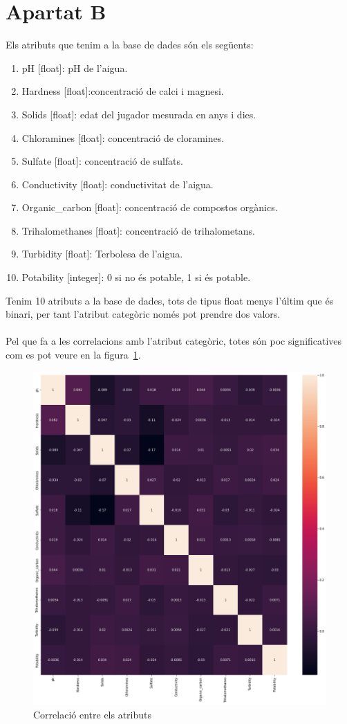 \documentclass{article}
\begin{document}
	\section*{Apartat B}
	Els atributs que tenim a la base de dades són els següents:
	\begin{enumerate}
		\addtocounter{enumi}{-1}
		\item pH [float]: pH de l'aigua.
		\item Hardness [float]:concentració de calci i magnesi.
		\item Solids [float]: edat del jugador mesurada en anys i dies.
		\item Chloramines [float]: concentració de cloramines. 
		\item Sulfate [float]: concentració de sulfats.
		\item Conductivity [float]: conductivitat de l'aigua.
		\item Organic\_carbon [float]: concentració de compostos orgànics.
		\item Trihalomethanes [float]: concentració de trihalometans.
		\item Turbidity [float]: Terbolesa de l'aigua.
		\item Potability [integer]: 0 si no és potable, 1 si és potable.
	\end{enumerate}
	Tenim 10 atributs a la base de dades, tots de tipus float menys l'últim que és binari, per tant l'atribut categòric només pot prendre dos valors.\\
	\\
	Pel que fa a les correlacions amb l'atribut categòric, totes són poc significatives com es pot veure en la figura~\ref{fig:correlacions}.\\
	\begin{figure}[!h]
		\centering
		\includegraphics[width=0.4\linewidth]{../images/correlacions}
		\caption{Correlació entre els atributs}
		\label{fig:correlacions}
	\end{figure}\\
\end{document}
